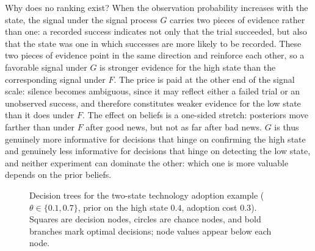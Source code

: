 Why does no ranking exist? When the observation probability increases
with the state, the signal under the signal process $G$ carries two
pieces of evidence rather than one: a recorded success indicates not
only that the trial succeeded, but also that the state was one in
which successes are more likely to be recorded. These two pieces of
evidence point in the same direction and reinforce each other, so a
favorable signal under $G$ is stronger evidence for the high state
than the corresponding signal under $F$. The price is paid at the
other end of the signal scale: silence becomes ambiguous, since it may
reflect either a failed trial or an unobserved success, and therefore
constitutes weaker evidence for the low state than it does under $F$.
The effect on beliefs is a one-sided stretch: posteriors move farther
than under $F$ after good news, but not as far after bad news. $G$ is
thus genuinely more informative for decisions that hinge on confirming
the high state and genuinely less informative for decisions that hinge
on detecting the low state, and neither experiment can dominate the
other: which one is more valuable depends on the prior beliefs.

\begin{figure}[t]
%
{Decision trees for the two-state technology adoption example
($\theta\in\{0.1,0.7\}$, prior on the high state $0.4$, adoption cost
$0.3$).\label{fig:tech-trees}}%
{Squares are decision nodes, circles are chance nodes, and bold
branches mark optimal decisions; node values appear below each node.}
\end{figure}
